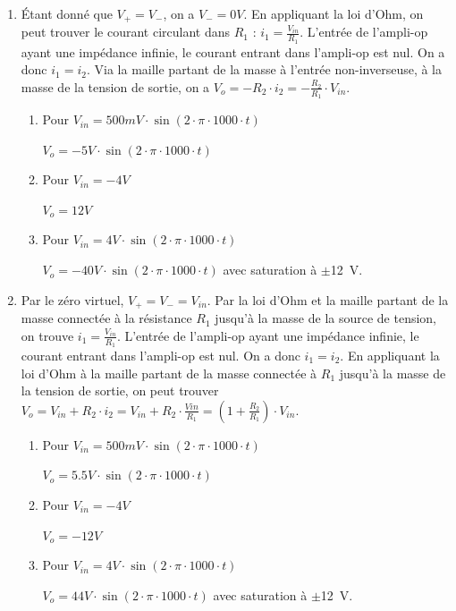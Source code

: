 \documentclass{../template/tp}
\begin{document}
{
	\begin{enumerate}
		\item Étant donné que $V_+ = V_-$, on a $V_- = 0 V$. En appliquant la loi d'Ohm, on peut trouver le courant circulant dans $R_1$ : $i_1 = \frac{V_{in}}{R_1}$. L'entrée de l'ampli-op ayant une impédance infinie, le courant entrant dans l'ampli-op est nul. On a donc $i_1 = i_2$. Via la maille partant de la masse à l'entrée non-inverseuse, à la masse de la tension de sortie, on a $V_{o} = -R_2\cdot i_2 = -\frac{R_2}{R_1}\cdot V_{in}$.
		\begin{enumerate}[label=\alph*)]
			\item Pour $V_{in} = 500 mV \cdot \sin(2\cdot \pi \cdot 1000 \cdot t)$

			$V_o = -5V \cdot \sin(2\cdot \pi \cdot 1000 \cdot t)$

			\item Pour $V_{in} = -4V$

			$V_o = 12 V$

			\item Pour $V_{in} = 4V \cdot \sin(2\cdot \pi \cdot 1000 \cdot t)$

			$V_o = -40 V \cdot \sin(2\cdot \pi \cdot 1000 \cdot t)$ avec saturation à $\pm$12~V.
			
		\end{enumerate}
		\item  Par le zéro virtuel, $V_+ = V_- = V_{in}$.
		Par la loi d'Ohm et la maille partant de la masse connectée à la résistance $R_1$ jusqu'à la masse de la source de tension, on trouve $i_1 = \frac{V_{in}}{R_1}$.
		L'entrée de l'ampli-op ayant une impédance infinie, le courant entrant dans l'ampli-op est nul. On a donc $i_1 = i_2$.
		En appliquant la loi d'Ohm à la maille partant de la masse connectée à $R_1$ jusqu'à la masse de la tension de sortie, on peut trouver $V_o = V_{in} + R_2\cdot i_2 = V_{in} + R_2 \cdot \frac{V{in}}{R_1} = (1 + \frac{R_2}{R_1}) \cdot V_{in}$.
		\begin{enumerate}[label=\alph*)]
			\item Pour $V_{in} = 500 mV \cdot \sin(2\cdot \pi \cdot 1000 \cdot t)$

			$V_o = 5.5 V \cdot \sin(2\cdot \pi \cdot 1000 \cdot t)$

			\item Pour $V_{in} = -4V$

			$V_o = -12 V$

			\item Pour $V_{in} = 4V \cdot \sin(2\cdot \pi \cdot 1000 \cdot t)$

			$V_o = 44 V \cdot \sin(2\cdot \pi \cdot 1000 \cdot t)$ avec saturation à $\pm$12~V.
			
		\end{enumerate}
	\end{enumerate}
}
\end{document}
